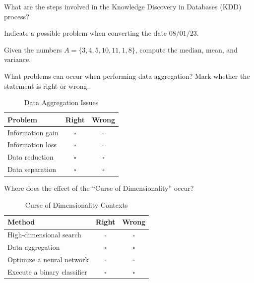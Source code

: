 \documentclass[12pt]{article}
\begin{document}
    \begin{ejercicio}
        What are the steps involved in the Knowledge Discovery in Databases (KDD) process?
    \end{ejercicio}

    \begin{ejercicio}
        Indicate a possible problem when converting the date $08/01/23$.
    \end{ejercicio}

    \begin{ejercicio}
        Given the numbers $A = \{3, 4, 5, 10, 11, 1, 8\}$, compute the median, mean, and variance.
    \end{ejercicio}

    \begin{ejercicio}
        What problems can occur when performing data aggregation? Mark whether the statement is right or wrong.

        \begin{table}[h!]
        \centering
        \begin{tabular}{lcc}
        \hline
        \textbf{Problem} & \textbf{Right} & \textbf{Wrong} \\ \hline
        Information gain & $\square$ & $\square$ \\
        Information loss & $\square$ & $\square$ \\
        Data reduction & $\square$ & $\square$ \\
        Data separation & $\square$ & $\square$ \\ \hline
        \end{tabular}
        \caption{Data Aggregation Issues}
        \label{tab:aggregation_issues}
        \end{table}
    \end{ejercicio}

    \begin{ejercicio}
        Where does the effect of the ``Curse of Dimensionality'' occur?

        \begin{table}[h!]
        \centering
        \begin{tabular}{lcc}
        \hline
        \textbf{Method} & \textbf{Right} & \textbf{Wrong} \\ \hline
        High-dimensional search & $\square$ & $\square$ \\
        Data aggregation & $\square$ & $\square$ \\
        Optimize a neural network & $\square$ & $\square$ \\
        Execute a binary classifier & $\square$ & $\square$ \\ \hline
        \end{tabular}
        \caption{Curse of Dimensionality Contexts}
        \label{tab:curse_dimensionality}
        \end{table}
    \end{ejercicio}
\end{document}
